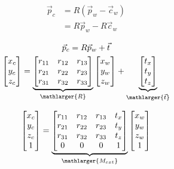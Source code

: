 \noindent 

\begin{subequations}
    \begin{align}
        \vec{p}_c & = R(\vec{p}_w-\vec{c}_w) \\
                  & = R\vec{p}_w -R\vec{c}_w  
    \end{align}
\end{subequations}



\begin{gather}
    \vec{p}_c = R\vec{p}_w + \vec{t} \\
    \begin{bmatrix}
        x_c \\ y_c \\ z_c
    \end{bmatrix}
    =
    \underbrace{
        \begin{bmatrix}
            r_{11} & r_{12} & r_{13} \\
            r_{21} & r_{22} & r_{23} \\
            r_{31} & r_{32} & r_{33}
        \end{bmatrix}
    }_{\mathlarger{R}}
    \begin{bmatrix}
        x_w \\ y_w \\ z_w
    \end{bmatrix}
    +
    \underbrace{  
        \begin{bmatrix}
            t_x \\ t_y \\ t_z
        \end{bmatrix}
    }_{\mathlarger{\vec{t}}}
\end{gather}


\begin{equation}
    \begin{bmatrix}
        x_c \\ y_c \\ z_c \\ 1
    \end{bmatrix}
    =
    \underbrace{
        \begin{bmatrix}
            r_{11} & r_{12} & r_{13} & t_x \\
            r_{21} & r_{22} & r_{23} & t_y \\
            r_{31} & r_{32} & r_{33} & t_z \\
            0      & 0      & 0      & 1
        \end{bmatrix}
    }_{\mathlarger{M_{ext}}}
    \begin{bmatrix}
        x_w \\ y_w \\ z_w \\1
    \end{bmatrix}
\end{equation}

